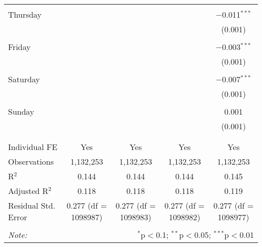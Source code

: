 \documentclass[
]{article}
\begin{document}
\begin{table}[!htbp]
{\begin{tabular}{@{\extracolsep{5pt}}lcccc}
  & & & & \\ 
 Thursday &  &  &  & $-$0.011$^{***}$ \\ 
  &  &  &  & (0.001) \\ 
  & & & & \\ 
 Friday &  &  &  & $-$0.003$^{***}$ \\ 
  &  &  &  & (0.001) \\ 
  & & & & \\ 
 Saturday &  &  &  & $-$0.007$^{***}$ \\ 
  &  &  &  & (0.001) \\ 
  & & & & \\ 
 Sunday &  &  &  & 0.001 \\ 
  &  &  &  & (0.001) \\ 
  & & & & \\ 
\hline \\[-1.8ex] 
Individual FE & Yes & Yes & Yes & Yes \\ 
Observations & 1,132,253 & 1,132,253 & 1,132,253 & 1,132,253 \\ 
R$^{2}$ & 0.144 & 0.144 & 0.144 & 0.145 \\ 
Adjusted R$^{2}$ & 0.118 & 0.118 & 0.118 & 0.119 \\ 
Residual Std. Error & 0.277 (df = 1098987) & 0.277 (df = 1098983) & 0.277 (df = 1098982) & 0.277 (df = 1098977) \\ 
\hline 
\hline \\[-1.8ex] 
\textit{Note:}  & \multicolumn{4}{r}{$^{*}$p$<$0.1; $^{**}$p$<$0.05; $^{***}$p$<$0.01} \\ 
\end{tabular}
} 
\end{table} 
\newpage
\end{document}
